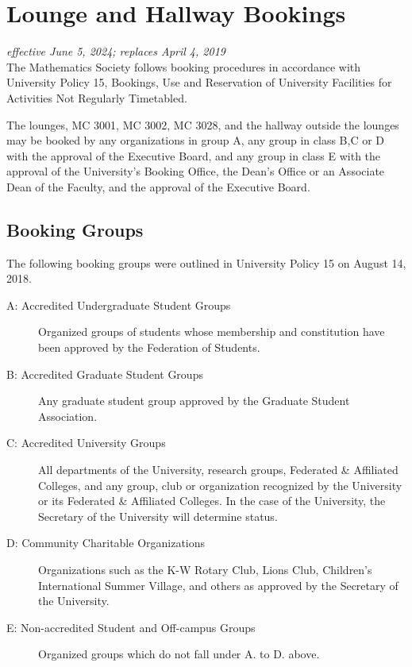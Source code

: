 \section{Lounge and Hallway Bookings}
\emph{effective June 5, 2024; replaces April 4, 2019}\\

The Mathematics Society follows booking procedures in accordance with 
University Policy 15, Bookings, Use and Reservation of University Facilities
for Activities Not Regularly Timetabled. 

The lounges, MC 3001, MC 3002, MC 3028, and the hallway outside the lounges may be
booked by any organizations in group A, any group in class B,C or D with the approval of the Executive Board, and any group in class E with the approval of the University’s Booking Office, the Dean’s Office or an Associate Dean of the Faculty, and the approval of the Executive Board.


\subsection{Booking Groups}

The following booking groups were outlined in University Policy 15 on 
August 14, 2018.

\begin{description}
\item[A: Accredited Undergraduate Student Groups] Organized groups of students
    whose membership and constitution have been approved by the Federation of
    Students.

\item[B: Accredited Graduate Student Groups] Any graduate student group
    approved by the Graduate Student Association.

\item[C: Accredited University Groups] All departments of the University,
    research groups, Federated \& Affiliated Colleges, and any group, club or
    organization recognized by the University or its Federated \& Affiliated
    Colleges. In the case of the University, the Secretary of the University
    will determine status.

\item[D: Community Charitable Organizations] Organizations such as the K-W
    Rotary Club, Lions Club, Children's International Summer Village, and
    others as approved by the Secretary of the University.

\item[E: Non-accredited Student and Off-campus Groups] Organized groups which
    do not fall under A. to D. above.
\end{description}


